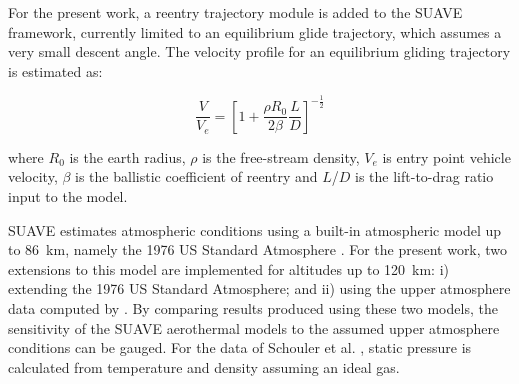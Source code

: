 \documentclass[%
 aip,
 amsmath,amssymb,
preprint,%
]{revtex4-1}
\begin{document}
For the present work, a reentry trajectory module is added to the SUAVE framework, currently limited to an equilibrium glide trajectory, which assumes a very small descent angle. The velocity profile for an equilibrium gliding trajectory is estimated as:

\begin{equation}
    \frac{V}{V_e} = \left[1 + \frac{\rho R_0}{2\beta} \frac{L}{D} \right]^{-\frac{1}{2}}
    \label{equ_glide}
\end{equation}

where $R_0$ is the earth radius, $\rho$ is the free-stream density, $V_e$ is entry point vehicle velocity, $\beta$ is the ballistic coefficient of reentry and $L$/$D$ is the lift-to-drag ratio input to the model.

SUAVE estimates atmospheric conditions using a built-in atmospheric model up to 86~km, namely the 1976 US Standard Atmosphere \citep{united_states_committee_on_extension_to_the_standard_atmosphere_us_1976}. For the present work, two extensions to this model are implemented for altitudes up to 120~km: i) extending the 1976 US Standard Atmosphere; and ii) using the upper atmosphere data computed by \cite{schouler_ixv_2021}. By comparing results produced using these two models, the sensitivity of the SUAVE aerothermal models to the assumed upper atmosphere conditions can be gauged. For the data of Schouler et al. \cite{schouler_ixv_2021}, static pressure is calculated from temperature and density assuming an ideal gas.


\end{document}
